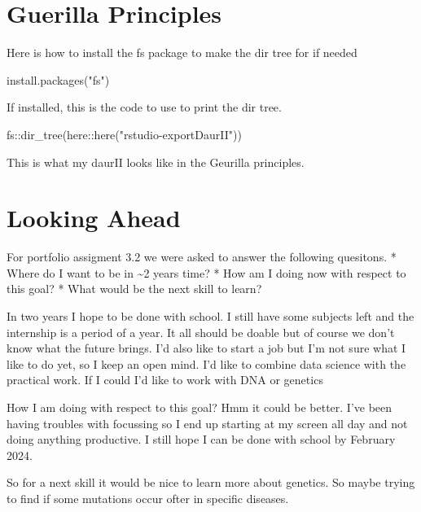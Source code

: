 \documentclass[
]{book}
\newenvironment{Shaded}{\begin{snugshade}}{\end{snugshade}}
\newcommand{\FunctionTok}[1]{\textcolor[rgb]{0.00,0.00,0.00}{#1}}
\newcommand{\NormalTok}[1]{#1}
\newcommand{\SpecialCharTok}[1]{\textcolor[rgb]{0.00,0.00,0.00}{#1}}
\newcommand{\StringTok}[1]{\textcolor[rgb]{0.31,0.60,0.02}{#1}}
\begin{document}
\hypertarget{guerilla-principles}{%
\chapter{Guerilla Principles}\label{guerilla-principles}}

Here is how to install the fs package to make the dir tree for if needed

\begin{Shaded}
\begin{Highlighting}[]
\FunctionTok{install.packages}\NormalTok{(}\StringTok{"fs"}\NormalTok{)}
\end{Highlighting}
\end{Shaded}

If installed, this is the code to use to print the dir tree.

\begin{Shaded}
\begin{Highlighting}[]
\NormalTok{fs}\SpecialCharTok{::}\FunctionTok{dir\_tree}\NormalTok{(here}\SpecialCharTok{::}\FunctionTok{here}\NormalTok{(}\StringTok{"rstudio{-}exportDaurII"}\NormalTok{))}
\end{Highlighting}
\end{Shaded}

This is what my daurII looks like in the Geurilla principles.

\hypertarget{looking-ahead}{%
\chapter{Looking Ahead}\label{looking-ahead}}

For portfolio assigment 3.2 we were asked to answer the following quesitons.
* Where do I want to be in \textasciitilde2 years time?
* How am I doing now with respect to this goal?
* What would be the next skill to learn?

In two years I hope to be done with school. I still have some subjects left and the internship is a period of a year. It all should be doable but of course we don't know what the future brings. I'd also like to start a job but I'm not sure what I like to do yet, so I keep an open mind. I'd like to combine data science with the practical work. If I could I'd like to work with DNA or genetics

How I am doing with respect to this goal? Hmm it could be better. I've been having troubles with focussing so I end up starting at my screen all day and not doing anything productive. I still hope I can be done with school by February 2024.

So for a next skill it would be nice to learn more about genetics. So maybe trying to find if some mutations occur ofter in specific diseases.
\end{document}
